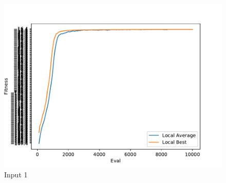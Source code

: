 \documentclass{standalone}
\begin{document}
\begin{figure}[!htb]
	\caption{Input 1}
	\label{fig:graph_1017}
	\includegraphics[width=\textwidth]{../graphs/graphs/1017.pdf}
\end{figure}
\end{document}

